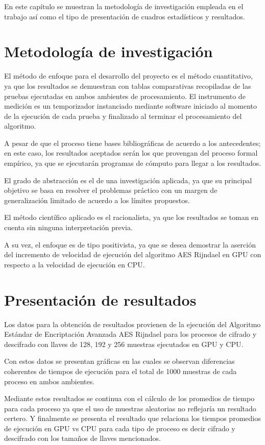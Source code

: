 \documentclass[../main/main.tex]{subfiles}
\begin{document}
\espacio
  En este capítulo se muestran la metodología de investigación empleada en el trabajo así como el tipo de presentación de cuadros estadísticos y resultados.

  \section{Metodología de investigación}

  El método de enfoque para el desarrollo del proyecto es el método cuantitativo, ya que los resultados se demuestran con tablas comparativas recopiladas de las pruebas ejecutadas en ambos ambientes de procesamiento. El instrumento de medición es un temporizador instanciado mediante software iniciado al momento de la ejecución de cada prueba y finalizado al terminar el procesamiento del algoritmo.

  A pesar de que el proceso tiene bases bibliográficas de acuerdo a los antecedentes; en este caso, los resultados aceptados serán los que provengan del proceso formal empírico, ya que se ejecutarán programas de cómputo para llegar a los resultados.

  El grado de abstracción es el de una investigación aplicada, ya que su principal objetivo se basa en resolver el problemas práctico con un margen de generalización limitado de acuerdo a los límites propuestos.

  El método científico aplicado es el racionalista, ya que los resultados se toman en cuenta sin ninguna interpretación previa.

  A su vez, el enfoque es de tipo positivista, ya que se desea demostrar la aserción del incremento de velocidad de ejecución del algoritmo AES Rijndael en GPU con respecto a la velocidad de ejecución en CPU.

  \section{Presentación de resultados}

  Los datos para la obtención de resultados provienen de la ejecución del Algoritmo Estándar de Encriptación Avanzada AES Rijndael para los procesos de cifrado y descifrado con llaves de 128, 192 y 256 muestras ejecutados en GPU y CPU.

  Con estos datos se presentan gráficas en las cuales se observan diferencias coherentes de tiempos de ejecución para el total de 1000 muestras de cada proceso en ambos ambientes.

  Mediante estos resultados se continua con el cálculo de los promedios de tiempo para cada proceso ya que el uso de muestras aleatorias no reflejaría un resultado certero. Y finalmente se presenta el resultado que relaciona los tiempos promedios de ejecución en GPU vs CPU para cada tipo de proceso es decir cifrado y descifrado con los tamaños de llaves mencionados.
\end{document}
